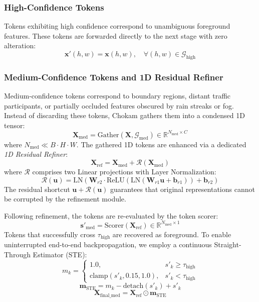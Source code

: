 \documentclass[conference]{IEEEtran}
\begin{document}
\subsubsection{High-Confidence Tokens}
Tokens exhibiting high confidence correspond to unambiguous foreground features. These tokens are forwarded directly to the next stage with zero alteration:
\begin{equation}
\mathbf{x}'(h, w) = \mathbf{x}(h, w), \quad \forall (h, w) \in \mathcal{G}_{\text{high}}
\end{equation}

\subsubsection{Medium-Confidence Tokens and 1D Residual Refiner}
Medium-confidence tokens correspond to boundary regions, distant traffic participants, or partially occluded features obscured by rain streaks or fog. Instead of discarding these tokens, Chokam gathers them into a condensed 1D tensor:
\begin{equation}
\mathbf{X}_{\text{med}} = \text{Gather}(\mathbf{X}, \mathcal{G}_{\text{med}}) \in \mathbb{R}^{N_{\text{med}} \times C}
\end{equation}
where $N_{\text{med}} \ll B \cdot H \cdot W$. The gathered 1D tokens are enhanced via a dedicated \textit{1D Residual Refiner}:
\begin{equation}
\mathbf{X}_{\text{ref}} = \mathbf{X}_{\text{med}} + \mathcal{R}(\mathbf{X}_{\text{med}})
\end{equation}
where $\mathcal{R}$ comprises two Linear projections with Layer Normalization:
\begin{equation}
\mathcal{R}(\mathbf{u}) = \text{LN}(\mathbf{W}_{r2} \cdot \text{ReLU}(\text{LN}(\mathbf{W}_{r1} \mathbf{u} + \mathbf{b}_{r1})) + \mathbf{b}_{r2})
\end{equation}
The residual shortcut $\mathbf{u} + \mathcal{R}(\mathbf{u})$ guarantees that original representations cannot be corrupted by the refinement module.

Following refinement, the tokens are re-evaluated by the token scorer:
\begin{equation}
\mathbf{s}'_{\text{med}} = \text{Scorer}(\mathbf{X}_{\text{ref}}) \in \mathbb{R}^{N_{\text{med}} \times 1}
\end{equation}
Tokens that successfully cross $\tau_{\text{high}}$ are recovered as foreground. To enable uninterrupted end-to-end backpropagation, we employ a continuous Straight-Through Estimator (STE):
\begin{equation}
m_k = \begin{cases} 1.0, & s'_k \ge \tau_{\text{high}} \\ \text{clamp}(s'_k, 0.15, 1.0), & s'_k < \tau_{\text{high}} \end{cases}
\end{equation}
\begin{equation}
\mathbf{m}_{\text{STE}} = m_k - \text{detach}(s'_k) + s'_k
\end{equation}
\begin{equation}
\mathbf{X}_{\text{final\_med}} = \mathbf{X}_{\text{ref}} \odot \mathbf{m}_{\text{STE}}
\end{equation}
\end{document}
